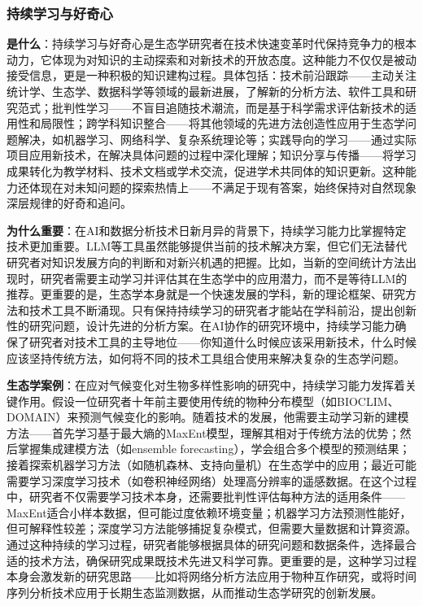 \documentclass[
]{book}
\begin{document}
\hypertarget{ux6301ux7eedux5b66ux4e60ux4e0eux597dux5947ux5fc3}{%
\subsubsection{持续学习与好奇心}\label{ux6301ux7eedux5b66ux4e60ux4e0eux597dux5947ux5fc3}}

\textbf{是什么}：持续学习与好奇心是生态学研究者在技术快速变革时代保持竞争力的根本动力，它体现为对知识的主动探索和对新技术的开放态度。这种能力不仅仅是被动接受信息，更是一种积极的知识建构过程。具体包括：技术前沿跟踪------主动关注统计学、生态学、数据科学等领域的最新进展，了解新的分析方法、软件工具和研究范式；批判性学习------不盲目追随技术潮流，而是基于科学需求评估新技术的适用性和局限性；跨学科知识整合------将其他领域的先进方法创造性应用于生态学问题解决，如机器学习、网络科学、复杂系统理论等；实践导向的学习------通过实际项目应用新技术，在解决具体问题的过程中深化理解；知识分享与传播------将学习成果转化为教学材料、技术文档或学术交流，促进学术共同体的知识更新。这种能力还体现在对未知问题的探索热情上------不满足于现有答案，始终保持对自然现象深层规律的好奇和追问。

\textbf{为什么重要}：在AI和数据分析技术日新月异的背景下，持续学习能力比掌握特定技术更加重要。LLM等工具虽然能够提供当前的技术解决方案，但它们无法替代研究者对知识发展方向的判断和对新兴机遇的把握。比如，当新的空间统计方法出现时，研究者需要主动学习并评估其在生态学中的应用潜力，而不是等待LLM的推荐。更重要的是，生态学本身就是一个快速发展的学科，新的理论框架、研究方法和技术工具不断涌现。只有保持持续学习的研究者才能站在学科前沿，提出创新性的研究问题，设计先进的分析方案。在AI协作的研究环境中，持续学习能力确保了研究者对技术工具的主导地位------你知道什么时候应该采用新技术，什么时候应该坚持传统方法，如何将不同的技术工具组合使用来解决复杂的生态学问题。

\textbf{生态学案例}：在应对气候变化对生物多样性影响的研究中，持续学习能力发挥着关键作用。假设一位研究者十年前主要使用传统的物种分布模型（如BIOCLIM、DOMAIN）来预测气候变化的影响。随着技术的发展，他需要主动学习新的建模方法------首先学习基于最大熵的MaxEnt模型，理解其相对于传统方法的优势；然后掌握集成建模方法（如ensemble forecasting），学会组合多个模型的预测结果；接着探索机器学习方法（如随机森林、支持向量机）在生态学中的应用；最近可能需要学习深度学习技术（如卷积神经网络）处理高分辨率的遥感数据。在这个过程中，研究者不仅需要学习技术本身，还需要批判性评估每种方法的适用条件------MaxEnt适合小样本数据，但可能过度依赖环境变量；机器学习方法预测性能好，但可解释性较差；深度学习方法能够捕捉复杂模式，但需要大量数据和计算资源。通过这种持续的学习过程，研究者能够根据具体的研究问题和数据条件，选择最合适的技术方法，确保研究成果既技术先进又科学可靠。更重要的是，这种学习过程本身会激发新的研究思路------比如将网络分析方法应用于物种互作研究，或将时间序列分析技术应用于长期生态监测数据，从而推动生态学研究的创新发展。
\end{document}
